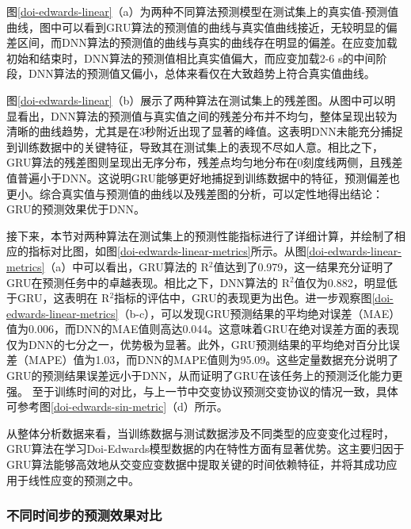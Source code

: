 图\ref{doi-edwards-linear}（a）为两种不同算法预测模型在测试集上的真实值-预测值曲线，图中可以看到GRU算法的预测值的曲线与真实值曲线接近，无较明显的偏差区间，而DNN算法的预测值的曲线与真实的曲线存在明显的偏差。在应变加载初始和结束时，DNN算法的预测值相比真实值偏大，而应变加载2-6 s的中间阶段，DNN算法的预测值又偏小，总体来看仅在大致趋势上符合真实值曲线。

图\ref{doi-edwards-linear}（b）展示了两种算法在测试集上的残差图。从图中可以明显看出，DNN算法的预测值与真实值之间的残差分布并不均匀，整体呈现出较为清晰的曲线趋势，尤其是在3秒附近出现了显著的峰值。这表明DNN未能充分捕捉到训练数据中的关键特征，导致其在测试集上的表现不尽如人意。相比之下，GRU算法的残差图则呈现出无序分布，残差点均匀地分布在0刻度线两侧，且残差值普遍小于DNN。这说明GRU能够更好地捕捉到训练数据中的特征，预测偏差也更小。综合真实值与预测值的曲线以及残差图的分析，可以定性地得出结论：GRU的预测效果优于DNN。

接下来，本节对两种算法在测试集上的预测性能指标进行了详细计算，并绘制了相应的指标对比图，如图\ref{doi-edwards-linear-metrics}所示。从图\ref{doi-edwards-linear-metrics}（a）中可以看出，GRU算法的 R$^2$值达到了0.979，这一结果充分证明了GRU在预测任务中的卓越表现。相比之下，DNN算法的 R$^2$值仅为0.882，明显低于GRU，这表明在 R$^2$指标的评估中，GRU的表现更为出色。进一步观察图\ref{doi-edwards-linear-metrics}（b-c），可以发现GRU预测结果的平均绝对误差（MAE）值为0.006，而DNN的MAE值则高达0.044。这意味着GRU在绝对误差方面的表现仅为DNN的七分之一，优势极为显著。此外，GRU预测结果的平均绝对百分比误差（MAPE）值为1.03，而DNN的MAPE值则为95.09。这些定量数据充分说明了GRU的预测结果误差远小于DNN，从而证明了GRU在该任务上的预测泛化能力更强。
至于训练时间的对比，与上一节中交变协议预测交变协议的情况一致，具体可参考图\ref{doi-edwards-sin-metric}（d）所示。

从整体分析数据来看，当训练数据与测试数据涉及不同类型的应变变化过程时，GRU算法在学习Doi-Edwards模型数据的内在特性方面有显著优势。这主要归因于GRU算法能够高效地从交变应变数据中提取关键的时间依赖特征，并将其成功应用于线性应变的预测之中。

\subsubsection{不同时间步的预测效果对比}

